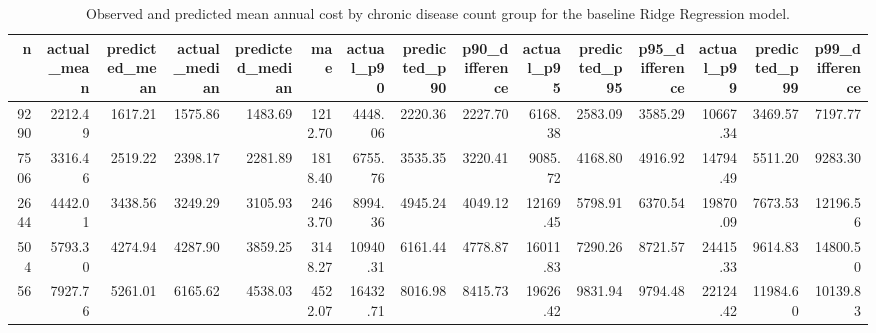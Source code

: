 \begin{table}
\caption{Observed and predicted mean annual cost by chronic disease count group for the baseline Ridge Regression model.}
\label{tab:03-ridge-group-summary-chronic-count}
\begin{tabular}{rrrrrrrrrrrrrrr}
\toprule
n & actual_mean & predicted_mean & actual_median & predicted_median & mae & actual_p90 & predicted_p90 & p90_difference & actual_p95 & predicted_p95 & p95_difference & actual_p99 & predicted_p99 & p99_difference \\
\midrule
9290 & 2212.49 & 1617.21 & 1575.86 & 1483.69 & 1212.70 & 4448.06 & 2220.36 & 2227.70 & 6168.38 & 2583.09 & 3585.29 & 10667.34 & 3469.57 & 7197.77 \\
7506 & 3316.46 & 2519.22 & 2398.17 & 2281.89 & 1818.40 & 6755.76 & 3535.35 & 3220.41 & 9085.72 & 4168.80 & 4916.92 & 14794.49 & 5511.20 & 9283.30 \\
2644 & 4442.01 & 3438.56 & 3249.29 & 3105.93 & 2463.70 & 8994.36 & 4945.24 & 4049.12 & 12169.45 & 5798.91 & 6370.54 & 19870.09 & 7673.53 & 12196.56 \\
504 & 5793.30 & 4274.94 & 4287.90 & 3859.25 & 3148.27 & 10940.31 & 6161.44 & 4778.87 & 16011.83 & 7290.26 & 8721.57 & 24415.33 & 9614.83 & 14800.50 \\
56 & 7927.76 & 5261.01 & 6165.62 & 4538.03 & 4522.07 & 16432.71 & 8016.98 & 8415.73 & 19626.42 & 9831.94 & 9794.48 & 22124.42 & 11984.60 & 10139.83 \\
\bottomrule
\end{tabular}
\end{table}
